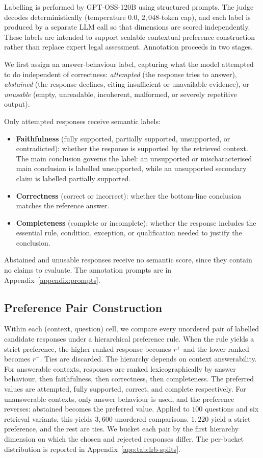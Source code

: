 \documentclass{article}
\theoremstyle{plain}
\theoremstyle{definition}
\theoremstyle{remark}
\begin{document}
Labelling is performed by GPT-OSS-120B using structured prompts. The judge decodes deterministically (temperature $0.0$, $2{,}048$-token cap), and each label is produced by a separate LLM call so that dimensions are scored independently. These labels are intended to support scalable contextual preference construction rather than replace expert legal assessment. Annotation proceeds in two stages.

We first assign an answer-behaviour label, capturing what the model attempted to do independent of correctness: \emph{attempted} (the response tries to answer), \emph{abstained} (the response declines, citing insufficient or unavailable evidence), or \emph{unusable} (empty, unreadable, incoherent, malformed, or severely repetitive output).

Only attempted responses receive semantic labels:
\begin{itemize}
    \item \textbf{Faithfulness} (fully supported, partially supported, unsupported, or contradicted): whether the response is supported by the retrieved context. The main conclusion governs the label: an unsupported or mischaracterised main conclusion is labelled unsupported, while an unsupported secondary claim is labelled partially supported.
    \item \textbf{Correctness} (correct or incorrect): whether the bottom-line conclusion matches the reference answer.
    \item \textbf{Completeness} (complete or incomplete): whether the response includes the essential rule, condition, exception, or qualification needed to justify the conclusion.
\end{itemize}

Abstained and unusable responses receive no semantic score, since they contain no claims to evaluate. The annotation prompts are in Appendix~\ref{appendix:prompts}.

\subsection{Preference Pair Construction}
\label{sec:hierarchical-preference-pair-construction}

Within each (context, question) cell, we compare every unordered pair of labelled candidate responses under a hierarchical preference rule. When the rule yields a strict preference, the higher-ranked response becomes $r^{+}$ and the lower-ranked becomes $r^{-}$. Ties are discarded. The hierarchy depends on context answerability. For answerable contexts, responses are ranked lexicographically by answer behaviour, then faithfulness, then correctness, then completeness. The preferred values are attempted, fully supported, correct, and complete respectively. For unanswerable contexts, only answer behaviour is used, and the preference reverses: abstained becomes the preferred value. Applied to $100$ questions and six retrieval variants, this yields $3{,}600$ unordered comparisons. $1{,}220$ yield a strict preference, and the rest are ties. We bucket each pair by the first hierarchy dimension on which the chosen and rejected responses differ. The per-bucket distribution is reported in Appendix~\ref{app:tab:lrb-splits}.
\end{document}
